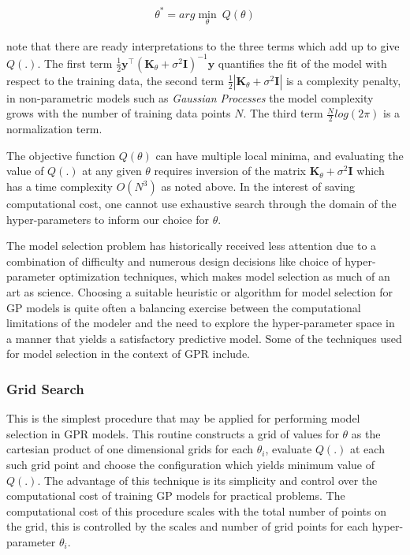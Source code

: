 \documentclass{article}
\begin{document}
\begin{align*}
\theta^* = arg\min_{\theta} \ Q(\theta)
\end{align*}

\citet{Rasmussen:2005:GPM:1162254} note that there are ready interpretations to the three terms which add up to give $Q(.)$. The first term $\frac{1}{2} \mathbf{y}^\intercal (\mathbf{K}_\theta + \sigma^{2} \mathbf{I})^{-1} \mathbf{y}$ quantifies the fit of the model with respect to the training data, the second term $\frac{1}{2}|\mathbf{K}_\theta + \sigma^{2} \mathbf{I}|$ is a complexity penalty, in non-parametric models such as \emph{Gaussian Processes} the model complexity grows with the number of training data points $N$. The third term $\frac{N}{2}log(2\pi)$ is a normalization term.

The objective function $Q(\theta)$ can have multiple local minima, and evaluating the value of $Q(.)$ at any given $\theta$ requires inversion of the matrix $\mathbf{K}_\theta + \sigma^{2} \mathbf{I}$ which has a time complexity $O(N^3)$ as noted above. In the interest of saving computational cost, one cannot use exhaustive search through the domain of the hyper-parameters to inform our choice for $\theta$.

The model selection problem has historically received less attention due to a combination of difficulty and numerous design decisions like choice of hyper-parameter optimization techniques, which makes model selection as much of an art as science. 
Choosing a suitable heuristic or algorithm for model selection for GP models is quite often a balancing exercise between the computational limitations of the modeler and the need to explore the hyper-parameter space in a manner that yields a satisfactory predictive model. Some of the techniques used for model selection in the context of GPR include.


\subsubsection*{Grid Search}

This is the simplest procedure that may be applied for performing model selection in GPR models. This routine constructs a grid of values for $\theta$ as the cartesian product of one dimensional grids for each $\theta_i$, evaluate $Q(.)$ at each such grid point and choose the configuration which yields minimum value of $Q(.)$. The advantage of this technique is its simplicity and control over the computational cost of training GP models for practical problems. The computational cost of this procedure scales with the total number of points on the grid, this is controlled by the scales and number of grid points for each hyper-parameter $\theta_i$.
\end{document}
